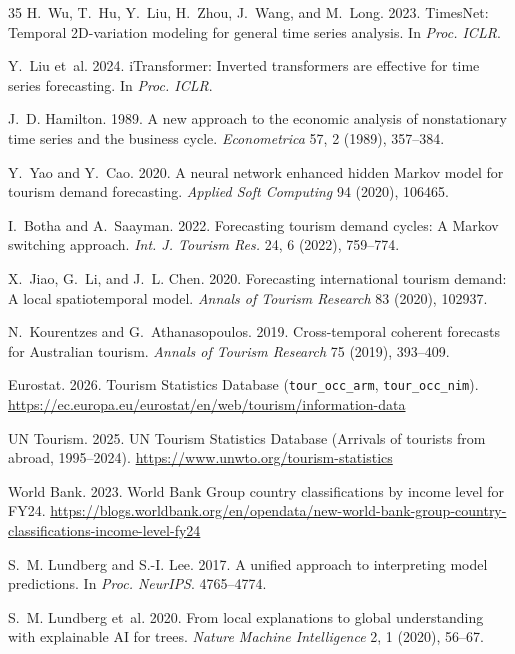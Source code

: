 \documentclass[sigconf]{acmart}
\begin{document}
\begin{thebibliography}{35}
H.~Wu, T.~Hu, Y.~Liu, H.~Zhou, J.~Wang, and M.~Long. 2023. TimesNet: Temporal 2D-variation modeling for general time series analysis. In \emph{Proc. ICLR}.

Y.~Liu et~al. 2024. iTransformer: Inverted transformers are effective for time series forecasting. In \emph{Proc. ICLR}.

J.~D. Hamilton. 1989. A new approach to the economic analysis of nonstationary time series and the business cycle. \emph{Econometrica} 57, 2 (1989), 357--384.

Y.~Yao and Y.~Cao. 2020. A neural network enhanced hidden Markov model for tourism demand forecasting. \emph{Applied Soft Computing} 94 (2020), 106465.

I.~Botha and A.~Saayman. 2022. Forecasting tourism demand cycles: A Markov switching approach. \emph{Int. J. Tourism Res.} 24, 6 (2022), 759--774.

X.~Jiao, G.~Li, and J.~L. Chen. 2020. Forecasting international tourism demand: A local spatiotemporal model. \emph{Annals of Tourism Research} 83 (2020), 102937.

N.~Kourentzes and G.~Athanasopoulos. 2019. Cross-temporal coherent forecasts for Australian tourism. \emph{Annals of Tourism Research} 75 (2019), 393--409.

Eurostat. 2026. Tourism Statistics Database (\texttt{tour\_occ\_arm}, \texttt{tour\_occ\_nim}). \url{https://ec.europa.eu/eurostat/en/web/tourism/information-data}

UN Tourism. 2025. UN Tourism Statistics Database (Arrivals of tourists from abroad, 1995--2024). \url{https://www.unwto.org/tourism-statistics}

World Bank. 2023. World Bank Group country classifications by income level for FY24. \url{https://blogs.worldbank.org/en/opendata/new-world-bank-group-country-classifications-income-level-fy24}

S.~M. Lundberg and S.-I. Lee. 2017. A unified approach to interpreting model predictions. In \emph{Proc. NeurIPS}. 4765--4774.

S.~M. Lundberg et~al. 2020. From local explanations to global understanding with explainable AI for trees. \emph{Nature Machine Intelligence} 2, 1 (2020), 56--67.

\end{thebibliography}
\endgroup
\end{document}
